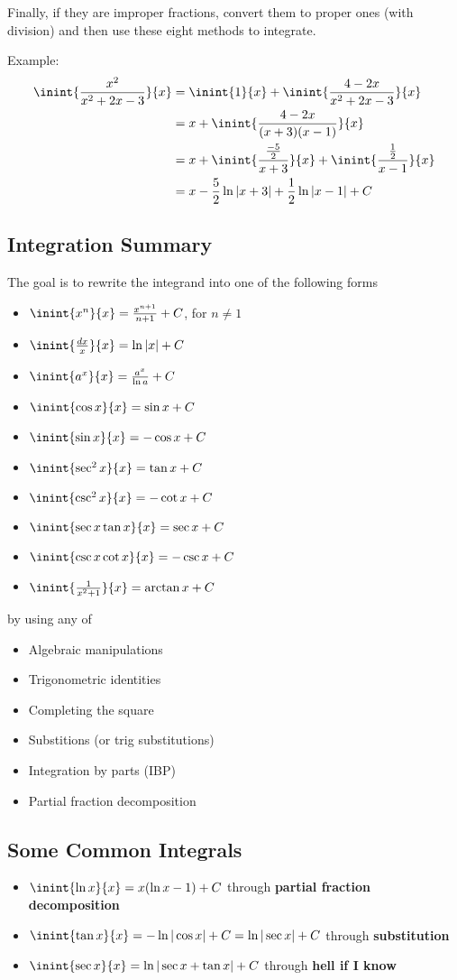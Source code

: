 \documentclass[12pt]{article}
\begin{document}
Finally, if they are improper fractions, convert them to proper ones (with division) and then use these eight methods to integrate.

Example:
\begin{align*}
\inint{\frac{x^2}{x^2+2x-3}}{x} &= \inint{1}{x} + \inint{\frac{4-2x}{x^2+2x-3}}{x}\\
&= x + \inint{\frac{4-2x}{(x+3)(x-1)}}{x}\\
&= x + \inint{\frac{\frac{-5}{2}}{x+3}}{x} + \inint{\frac{\half }{x-1}}{x}\\
&= x - \frac{5}{2}\ln|x+3| + \half \ln|x-1| + C
\end{align*}

\subsection*{Integration Summary}
The goal is to rewrite the integrand into one of the following forms
\begin{itemize}
\item $\inint{x^n}{x} = \frac{x^{n+1}}{n+1} + C$, for $n \neq 1$
\item $\inint{\frac{dx}{x}}{x} = \ln|x| + C$
\item $\inint{a^x}{x} = \frac{a^x}{\ln a} + C$
\item $\inint{\cos x}{x} = \sin x + C$
\item $\inint{\sin x}{x} = -\cos x + C$
\item $\inint{\sec^2 x}{x} = \tan x + C$
\item $\inint{\csc^2 x}{x} = -\cot x + C$
\item $\inint{\sec x\tan x}{x} = \sec x + C$
\item $\inint{\csc x\cot x}{x} = -\csc x + C$
\item $\inint{\frac{1}{x^2+1}}{x} = \arctan x + C$
\end{itemize}
by using any of
\begin{itemize}
\item Algebraic manipulations
\item Trigonometric identities
\item Completing the square
\item Substitions (or trig substitutions)
\item Integration by parts (IBP)
\item Partial fraction decomposition
\end{itemize}

\subsection*{Some Common Integrals}
\begin{itemize}
\item $\inint{\ln x}{x} = x(\ln x - 1) + C$ through {\bf partial fraction decomposition}
\item $\inint{\tan x}{x} = -\ln |\cos x| + C = \ln |\sec x| + C$ through {\bf substitution}
\item $\inint{\sec x}{x} = \ln |\sec x + \tan x| + C$ through {\bf hell if I know}
\end{itemize}
\end{document}
